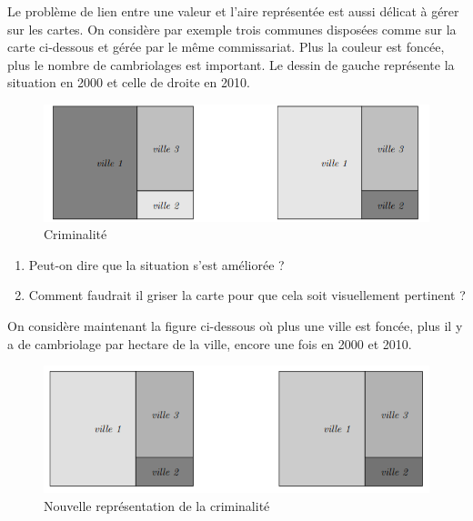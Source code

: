 \documentclass[10pt, a4paper]{article}
\begin{document}
\begin{tcolorbox}[lefttitle=2cm, colframe=gray!75!black, colback=white, title=\textbf{EXERCICE 5 : Analyse de trois datavisualisations de données.}]




Le problème de lien entre une valeur et l’aire représentée est aussi délicat à gérer sur les cartes. On
considère par exemple trois communes disposées comme sur la carte ci-dessous et gérée par le même commissariat.
Plus la couleur est foncée, plus le nombre de cambriolages est important. Le dessin de gauche représente la situation
en 2000 et celle de droite en 2010.

\begin{figure}[H]
    \centering
    \includegraphics[scale =0.5]{chapitre1/figures/villes.png}
    \caption{Criminalité}
    \label{fig:crim1}
\end{figure}
\begin{tcolorbox}[lefttitle=2cm, colback=white, colframe=gray!95!black, title=\textbf{EXERCICE 5.1 : Analyse de la Figure~\ref{fig:crim1}}]
\begin{enumerate}
    \item Peut-on dire que la situation s’est améliorée ? 
    \item Comment faudrait il griser la carte pour que cela soit visuellement
pertinent ?
\end{enumerate}
\vspace{1.5cm}
\end{tcolorbox}

\begin{tcolorbox}[lefttitle=2cm, colback=white,colframe=gray!95!black, title=\textbf{EXERCICE 5.2 : Nouvelle analyse}]
On considère maintenant la figure ci-dessous où plus une ville est foncée, plus il y a de cambriolage par hectare de la ville, encore une fois en 2000 et 2010.

\begin{figure}[H]
    \centering
    \includegraphics[scale =0.5]{chapitre1/figures/villes2.png}
    \caption{Nouvelle représentation de la criminalité}
    \label{fig:enter-label}
\end{figure}



\end{tcolorbox}
\end{tcolorbox}
\end{document}
